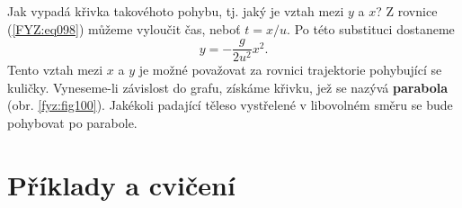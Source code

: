 {    Jak vypadá křivka takovéhoto pohybu, tj. jaký je vztah mezi \(y\) a \(x\)? Z rovnice 
    (\ref{FYZ:eq098}) můžeme vyloučit čas, neboť \(t= x/u\). Po této substituci dostaneme
    \begin{equation}\label{FYZ:eq099}
      y = -\frac{g}{2u^2}x^2.
    \end{equation}
    Tento vztah mezi \(x\) a \(y\) je možné považovat za rovnici trajektorie pohybující se kuličky. 
    Vyneseme-li závislost do grafu, získáme křivku, jež se nazývá \textbf{parabola} (obr. 
    \ref{fyz:fig100}). Jakékoli padající těleso vystřelené v libovolném směru se bude pohybovat po 
    parabole. 
  
  \newpage
  \section{Příklady a cvičení}
      

} %
\printbibliography[heading=subbibliography]
